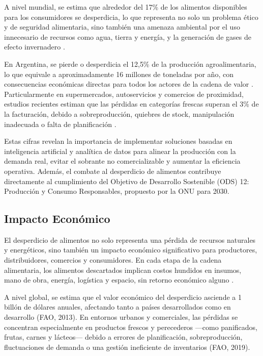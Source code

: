 A nivel mundial, se estima que alrededor del 17\% de los alimentos disponibles para los consumidores se desperdicia, lo que representa no solo un problema ético y de seguridad alimentaria, sino también una amenaza ambiental por el uso innecesario de recursos como agua, tierra y energía, y la generación de gases de efecto invernadero \parencite{unep2021}.

En Argentina, se pierde o desperdicia el 12{,}5\% de la producción agroalimentaria, lo que equivale a aproximadamente 16 millones de toneladas por año, con consecuencias económicas directas para todos los actores de la cadena de valor \parencite{tiscornia2022}. Particularmente en supermercados, autoservicios y comercios de proximidad, estudios recientes estiman que las pérdidas en categorías frescas superan el 3\% de la facturación, debido a sobreproducción, quiebres de stock, manipulación inadecuada o falta de planificación \parencite{weteam2021}.

Estas cifras revelan la importancia de implementar soluciones basadas en inteligencia artificial y analítica de datos para alinear la producción con la demanda real, evitar el sobrante no comercializable y aumentar la eficiencia operativa. Además, el combate al desperdicio de alimentos contribuye directamente al cumplimiento del Objetivo de Desarrollo Sostenible (ODS) 12: Producción y Consumo Responsables, propuesto por la ONU para 2030.

\subsection{Impacto Económico}

El desperdicio de alimentos no solo representa una pérdida de recursos naturales y energéticos, sino también un impacto económico significativo para productores, distribuidores, comercios y consumidores. En cada etapa de la cadena alimentaria, los alimentos descartados implican costos hundidos en insumos, mano de obra, energía, logística y espacio, sin retorno económico alguno \parencite{gustavsson2011}.

A nivel global, se estima que el valor económico del desperdicio asciende a 1 billón de dólares anuales, afectando tanto a países desarrollados como en desarrollo (FAO, 2013). En entornos urbanos y comerciales, las pérdidas se concentran especialmente en productos frescos y perecederos —como panificados, frutas, carnes y lácteos— debido a errores de planificación, sobreproducción, fluctuaciones de demanda o una gestión ineficiente de inventarios (FAO, 2019).

